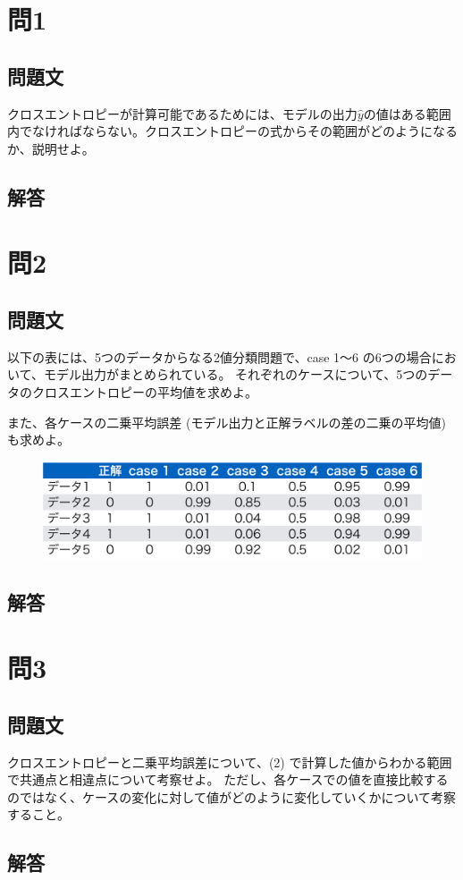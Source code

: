 \documentclass{article}[jsarticle]
\begin{document}
\section{問1} 
\subsection{問題文}
クロスエントロピーが計算可能であるためには、モデルの出力$\hat{y}$の値はある範囲内でなければならない。クロスエントロピーの式からその範囲がどのようになるか、説明せよ。
\subsection{解答}
\section{問2}
\subsection{問題文}
以下の表には、5つのデータからなる2値分類問題で、case 1～6 の6つの場合において、モデル出力がまとめられている。
それぞれのケースについて、5つのデータのクロスエントロピーの平均値を求めよ。\par 
また、各ケースの二乗平均誤差 (モデル出力と正解ラベルの差の二乗の平均値) も求めよ。
\begin{figure}[H]
    \centering
    \includegraphics[scale=0.3]{./2023-06-23215207.png}
\end{figure}
\subsection{解答}
\section{問3}
\subsection{問題文}
クロスエントロピーと二乗平均誤差について、(2) で計算した値からわかる範囲で共通点と相違点について考察せよ。
ただし、各ケースでの値を直接比較するのではなく、ケースの変化に対して値がどのように変化していくかについて考察すること。
\subsection{解答}


  
\end{document}
